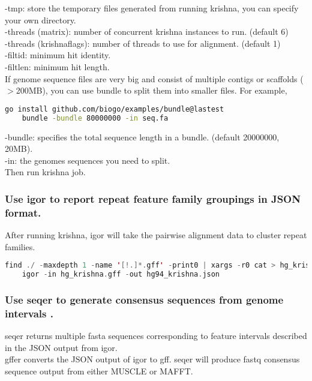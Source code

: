 \documentclass[a4paper,12pt]{article}
\begin{document}
	\noindent -tmp: store the temporary files generated from running krishna, you can specify your own directory. \\
	-threads (matrix): number of concurrent krishna instances to run. (default 6) \\
	-threads (krishnaflags): number of threads to use for alignment. (default 1) \\
	-filtid: minimum hit identity. \\
	-filtlen: minimum hit length. \\
	
	\noindent If genome sequence files are very big and consist of multiple contigs or scaffolds ($>$200MB), you can use bundle to split them into smaller files. For example,
	
	\begin{lstlisting}[language=bash]
	go install github.com/biogo/examples/bundle@lastest
	bundle -bundle 80000000 -in seq.fa \end{lstlisting}
	
	\noindent -bundle: specifies the total sequence length in a bundle. (default 20000000, 20MB).\\
	-in: the genomes sequences you need to split.\\
	Then run krishna job.\\
	
	\subsubsection{Use igor to report repeat feature family groupings in JSON format.}
	
	After running krishna, igor will take the pairwise alignment data to cluster repeat families.
	\begin{lstlisting}[language=scala]
	find ./ -maxdepth 1 -name '[!.]*.gff' -print0 | xargs -r0 cat > hg_krishna.gff
	igor -in hg_krishna.gff -out hg94_krishna.json \end{lstlisting}
	
	\subsubsection{Use seqer to generate consensus sequences from genome intervals .}
	seqer returns multiple fasta sequences corresponding to feature intervals described in the JSON output from igor. \\
	
	\noindent gffer converts the JSON output of igor to gff. seqer will produce fastq consensus sequence output from either MUSCLE or MAFFT. 
	
\end{document}
